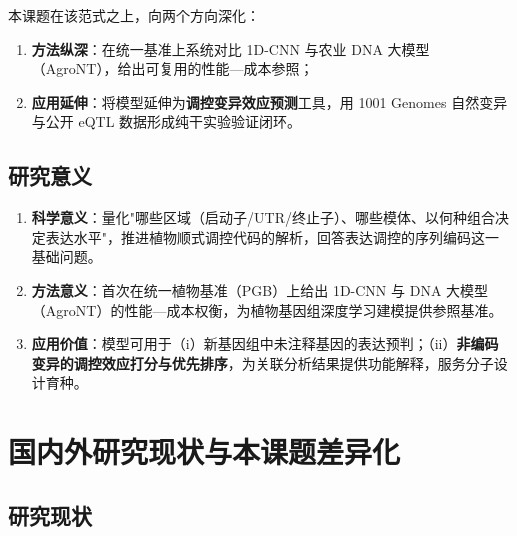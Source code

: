 \documentclass[UTF8,11pt,a4paper]{ctexart}
\begin{document}
本课题在该范式之上，向两个方向深化：
\begin{enumerate}
\item \textbf{方法纵深}：在统一基准上系统对比 1D-CNN 与农业 DNA 大模型（AgroNT\cite{mendoza2024}），给出可复用的性能—成本参照；
\item \textbf{应用延伸}：将模型延伸为\textbf{调控变异效应预测}工具，用 1001 Genomes 自然变异与公开 eQTL 数据形成纯干实验验证闭环。
\end{enumerate}

\subsection{研究意义}
\label{sec:intro-sig}

\begin{enumerate}
\item \textbf{科学意义}：量化"哪些区域（启动子/UTR/终止子）、哪些模体、以何种组合决定表达水平"，推进植物顺式调控代码的解析，回答表达调控的序列编码这一基础问题。
\item \textbf{方法意义}：首次在统一植物基准（PGB\cite{pgb2024}）上给出 1D-CNN 与 DNA 大模型（AgroNT）的性能—成本权衡，为植物基因组深度学习建模提供参照基准\cite{mendoza2024}。
\item \textbf{应用价值}：模型可用于（i）新基因组中未注释基因的表达预判；（ii）\textbf{非编码变异的调控效应打分与优先排序}，为关联分析结果提供功能解释，服务分子设计育种。
\end{enumerate}

\section{国内外研究现状与本课题差异化}
\label{sec:survey}

\subsection{研究现状}
\label{sec:survey-state}
\end{document}
